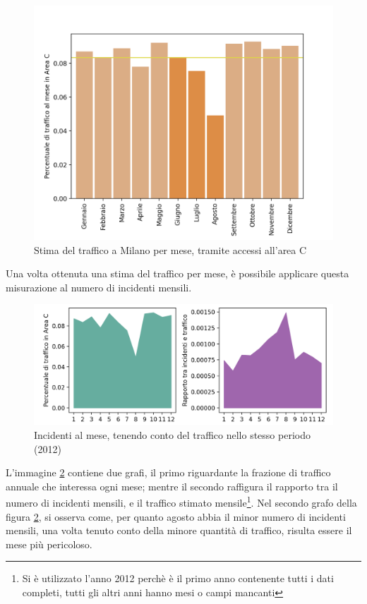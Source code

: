 \documentclass[a4paper]{report}
\begin{document}
\begin{figure}
    \includegraphics[width=\linewidth]{../src/area_c/stima_traffico_mese.png}
    \caption{Stima del traffico a Milano per mese, tramite accessi all'area C}
    \label{fig:stima-traffico-mensile}
\end{figure}

Una volta ottenuta una stima del traffico per mese, è possibile applicare questa misurazione 
al numero di incidenti mensili.

\begin{figure}
    \includegraphics[width=\linewidth]{../src/area_c/rapporto_mese.png}
    \caption{Incidenti al mese, tenendo conto del traffico nello stesso periodo (2012)}
    \label{fig:incidenti-traffico-mese}
\end{figure}

L'immagine \ref{fig:incidenti-traffico-mese} contiene due grafi, 
il primo riguardante la frazione di traffico annuale che interessa ogni mese; 
mentre il secondo raffigura il rapporto tra il numero di incidenti mensili, e il traffico 
stimato mensile\footnote{Si è utilizzato l'anno 2012 perchè è il primo anno contenente tutti i dati completi, 
tutti gli altri anni hanno mesi o campi mancanti}.
Nel secondo grafo della figura \ref{fig:incidenti-traffico-mese}, si osserva come, per quanto agosto 
abbia il minor numero di incidenti mensili, una volta tenuto conto della minore quantità di traffico, 
risulta essere il mese più pericoloso.
\end{document}
